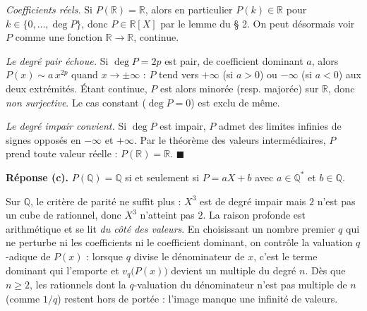 
\begin{mdframed}[style=proofbar]
  \textit{Coefficients réels.}\enspace
  Si $P(\mathbb{R}) = \mathbb{R}$, alors en particulier $P(k) \in \mathbb{R}$
  pour $k \in \{0,\ldots,\deg P\}$, donc $P \in \mathbb{R}[X]$ par le lemme du
  § 2. On peut désormais voir $P$ comme une fonction $\mathbb{R} \to \mathbb{R}$,
  continue.

  \smallskip\noindent
  \textit{Le degré pair échoue.}\enspace
  Si $\deg P = 2p$ est pair, de coefficient dominant $a$, alors
  $P(x) \sim a\,x^{2p}$ quand $x \to \pm\infty$ : $P$ tend vers $+\infty$ (si
  $a>0$) ou $-\infty$ (si $a<0$) aux deux extrémités. Étant continue, $P$ est
  alors minorée (resp. majorée) sur $\mathbb{R}$, donc \emph{non surjective}.
  Le cas constant ($\deg P = 0$) est exclu de même.

  \smallskip\noindent
  \textit{Le degré impair convient.}\enspace
  Si $\deg P$ est impair, $P$ admet des limites infinies de signes opposés en
  $-\infty$ et $+\infty$. Par le théorème des valeurs intermédiaires, $P$ prend
  toute valeur réelle : $P(\mathbb{R}) = \mathbb{R}$.
  \hfill$\blacksquare$
\end{mdframed}

\decsep{}


\begin{tcolorbox}[thmbox]
  \textbf{Réponse (c).}\enspace%
  $P(\mathbb{Q}) = \mathbb{Q}$ si et seulement si $P = aX + b$ avec
  $a \in \mathbb{Q}^*$ et $b \in \mathbb{Q}$.
\end{tcolorbox}

\begin{significationintuitive}
Sur $\mathbb{Q}$, le critère de parité ne suffit plus : $X^3$ est de degré
impair mais $2$ n'est pas un cube de rationnel, donc $X^3$ n'atteint pas $2$.
La raison profonde est arithmétique et se lit \emph{du côté des valeurs}. En
choisissant un nombre premier $q$ qui ne perturbe ni les coefficients ni le
coefficient dominant, on contrôle la valuation $q$-adique de $P(x)$ : lorsque
$q$ divise le dénominateur de $x$, c'est le terme dominant qui l'emporte et
$v_q\bigl(P(x)\bigr)$ devient un multiple du degré $n$. Dès que $n \geq 2$, les
rationnels dont la $q$-valuation du dénominateur n'est pas multiple de $n$
(comme $1/q$) restent hors de portée : l'image manque une infinité de valeurs.
\end{significationintuitive}

